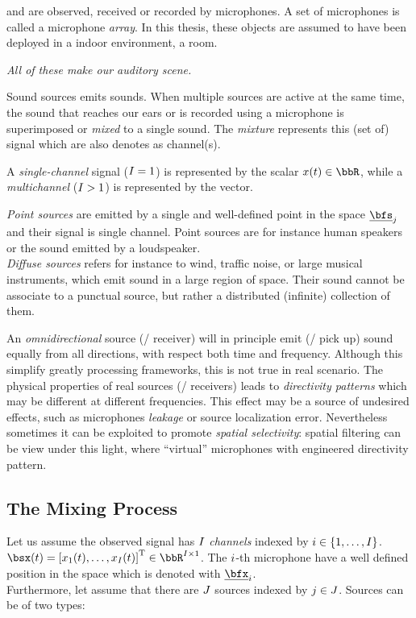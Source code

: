  and are observed, received or recorded by microphones.
A set of microphones is called a microphone \textit{array}.
In this thesis, these objects are assumed to have been deployed in a indoor environment, a room.
\begin{center}
    \textit{All of these make our \emph{auditory scene}.}
\end{center}

Sound sources emits sounds.
When multiple sources are active at the same time, the sound that reaches our ears or is recorded using a microphone is superimposed or \textit{mixed} to a single sound.
The \textit{mixture} represents this (set of) signal which are also denotes as channel(s).

A \textit{single-channel} signal ($I = 1$) is represented by the scalar $\mic(t) \in \R$,
while a \textit{multichannel} ($I >   1$) is represented by the vector.

\textit{Point sources} are emitted by a single and well-defined point in the space $\positionSource_\idxSrc$ and their signal is single channel.
Point sources are for instance human speakers or the sound emitted by a loudspeaker.
\\\textit{Diffuse sources} refers for instance to wind, traffic noise, or large musical instruments, which emit sound in a large region of space.
Their sound cannot be associate to a punctual source, but rather a distributed (infinite) collection of them.

An \textit{omnidirectional} source (\resp/ receiver) will in principle emit (\resp/ pick up) sound equally from all directions,
with respect both time and frequency.
Although this simplify greatly processing frameworks, this is not true in real scenario.
The physical properties of real sources (\resp/ receivers) leads to \textit{directivity patterns} which may
be different at different frequencies.
This effect may be a source of undesired effects, such as microphones \textit{leakage} or source localization error.
Nevertheless sometimes it can be exploited to promote \textit{spatial selectivity}:
spatial filtering can be view under this light, where ``virtual'' microphones with engineered directivity pattern.

\subsection{The Mixing Process}
Let us assume the observed signal has $I$ \textit{channels} indexed by $\idxMic \in \kbrace{1,\dots,\numMics}$.
$\mics(t) = \ktranspose{\klist{\mic_1(t), \dots, \mic_{\numMics}(t)}} \in \R^{\numMics \times 1}$.
The $i$-th microphone have a well defined position in the space which is denoted with $\positionMicrophone_\idxMic$.
\\Furthermore, let assume that there are $J$ sources indexed by $j \in J$.
Sources can be of two types:

